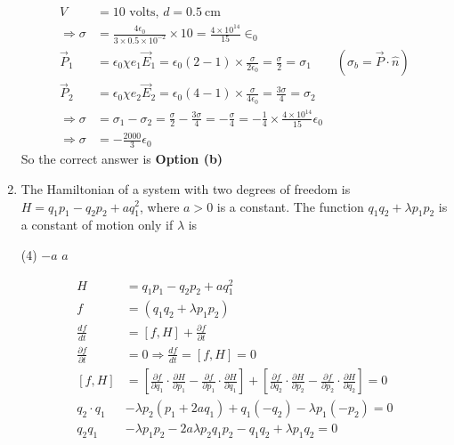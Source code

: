 \begin{enumerate}
\begin{answer}
\begin{align*}
	V&=10 \text { volts, } d=0.5 \mathrm{~cm} \\
	\Rightarrow \sigma&=\frac{4 \epsilon_{0}}{3 \times 0.5 \times 10^{-2}} \times 10=\frac{4 \times 10^{14}}{15} \in_{0} \\
	\vec{P}_{1}&=\epsilon_{0} \chi e_{1} \vec{E}_{1}=\epsilon_{0}(2-1) \times \frac{\sigma}{2 \epsilon_{0}}=\frac{\sigma}{2}=\sigma_{1}\qquad \left(\sigma_{b}=\vec{P} \cdot \hat{n}\right)\\
	\vec{P}_{2}&=\epsilon_{0} \chi e_{2} \vec{E}_{2}=\epsilon_{0}(4-1) \times \frac{\sigma}{4 \epsilon_{0}}=\frac{3 \sigma}{4}=\sigma_{2} \\
	\Rightarrow \sigma&=\sigma_{1}-\sigma_{2}=\frac{\sigma}{2}-\frac{3 \sigma}{4}=-\frac{\sigma}{4}=-\frac{1}{4} \times \frac{4 \times 10^{14}}{15} \epsilon_{0} \\
	\Rightarrow \sigma&=-\frac{2000}{3} \epsilon_{0}
	\end{align*}
		So the correct answer is \textbf{Option (b)}
\end{answer}
\item The Hamiltonian of a system with two degrees of freedom is $H=q_{1} p_{1}-q_{2} p_{2}+a q_{1}^{2}$, where $a>0$ is a constant. The function $q_{1} q_{2}+\lambda p_{1} p_{2}$ is a constant of motion only if $\lambda$ is
 \begin{tasks}(4)
	\task[\textbf{c.}]$-a$
	\task[\textbf{d.}] $a$
\end{tasks}
\begin{answer}
	\begin{align*}
	H&=q_{1} p_{1}-q_{2} p_{2}+a q_{1}^{2}\\
	f&=\left(q_{1} q_{2}+\lambda p_{1} p_{2}\right) \\
	\frac{d f}{d t}&=[f, H]+\frac{\partial f}{\partial t} \\
	\frac{\partial f}{\partial t}&=0 \Rightarrow \frac{d f}{d t}=[f, H]=0\\
	[f, H]&=\left[\frac{\partial f}{\partial q_{1}} \cdot \frac{\partial H}{\partial p_{1}}-\frac{\partial f}{\partial p_{1}} \cdot \frac{\partial H}{\partial q_{1}}\right]+\left[\frac{\partial f}{\partial q_{2}} \cdot \frac{\partial H}{\partial p_{2}}-\frac{\partial f}{\partial p_{2}} \cdot \frac{\partial H}{\partial q_{2}}\right]=0 \\
	q_{2} \cdot q_{1}&-\lambda p_{2}\left(p_{1}+2 a q_{1}\right)+q_{1}\left(-q_{2}\right)-\lambda p_{1}\left(-p_{2}\right)=0 \\
	q_{2} q_{1}&-\lambda p_{1} p_{2}-2 a \lambda p_{2} q_{1} p_{2}-q_{1} q_{2}+\lambda p_{1} q_{2}=0 \\

\end{align*}
\end{answer}
\end{enumerate}
